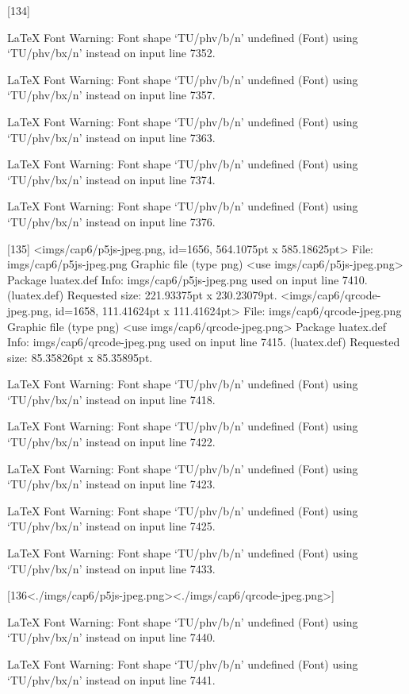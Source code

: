 [134]

LaTeX Font Warning: Font shape `TU/phv/b/n' undefined
(Font)              using `TU/phv/bx/n' instead on input line 7352.


LaTeX Font Warning: Font shape `TU/phv/b/n' undefined
(Font)              using `TU/phv/bx/n' instead on input line 7357.


LaTeX Font Warning: Font shape `TU/phv/b/n' undefined
(Font)              using `TU/phv/bx/n' instead on input line 7363.


LaTeX Font Warning: Font shape `TU/phv/b/n' undefined
(Font)              using `TU/phv/bx/n' instead on input line 7374.


LaTeX Font Warning: Font shape `TU/phv/b/n' undefined
(Font)              using `TU/phv/bx/n' instead on input line 7376.

[135]
<imgs/cap6/p5js-jpeg.png, id=1656, 564.1075pt x 585.18625pt>
File: imgs/cap6/p5js-jpeg.png Graphic file (type png)
<use imgs/cap6/p5js-jpeg.png>
Package luatex.def Info: imgs/cap6/p5js-jpeg.png  used on input line 7410.
(luatex.def)             Requested size: 221.93375pt x 230.23079pt.
<imgs/cap6/qrcode-jpeg.png, id=1658, 111.41624pt x 111.41624pt>
File: imgs/cap6/qrcode-jpeg.png Graphic file (type png)
<use imgs/cap6/qrcode-jpeg.png>
Package luatex.def Info: imgs/cap6/qrcode-jpeg.png  used on input line 7415.
(luatex.def)             Requested size: 85.35826pt x 85.35895pt.

LaTeX Font Warning: Font shape `TU/phv/b/n' undefined
(Font)              using `TU/phv/bx/n' instead on input line 7418.


LaTeX Font Warning: Font shape `TU/phv/b/n' undefined
(Font)              using `TU/phv/bx/n' instead on input line 7422.


LaTeX Font Warning: Font shape `TU/phv/b/n' undefined
(Font)              using `TU/phv/bx/n' instead on input line 7423.


LaTeX Font Warning: Font shape `TU/phv/b/n' undefined
(Font)              using `TU/phv/bx/n' instead on input line 7425.


LaTeX Font Warning: Font shape `TU/phv/b/n' undefined
(Font)              using `TU/phv/bx/n' instead on input line 7433.

[136<./imgs/cap6/p5js-jpeg.png><./imgs/cap6/qrcode-jpeg.png>]

LaTeX Font Warning: Font shape `TU/phv/b/n' undefined
(Font)              using `TU/phv/bx/n' instead on input line 7440.


LaTeX Font Warning: Font shape `TU/phv/b/n' undefined
(Font)              using `TU/phv/bx/n' instead on input line 7441.


